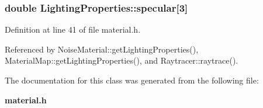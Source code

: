 \subsubsection[{specular}]{\setlength{\rightskip}{0pt plus 5cm}double Lighting\+Properties\+::specular[3]}\label{class_lighting_properties_a51c284c37c2b0ce9eb430b2091254eb8}


Definition at line 41 of file material.\+h.



Referenced by Noise\+Material\+::get\+Lighting\+Properties(), Material\+Map\+::get\+Lighting\+Properties(), and Raytracer\+::raytrace().



The documentation for this class was generated from the following file\+:\begin{DoxyCompactItemize}
\item 
{\bf material.\+h}\end{DoxyCompactItemize}
